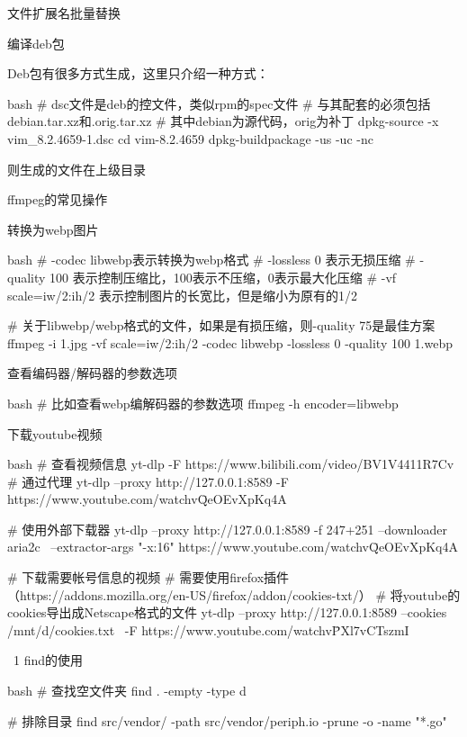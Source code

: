 \begin{outline}[enumerate]
\1 文件扩展名批量替换


\1 编译deb包

Deb包有很多方式生成，这里只介绍一种方式：
\begin{code-block}{bash}
# dsc文件是deb的控文件，类似rpm的spec文件
# 与其配套的必须包括debian.tar.xz和.orig.tar.xz
# 其中debian为源代码，orig为补丁
dpkg-source -x  vim_8.2.4659-1.dsc
cd vim-8.2.4659
dpkg-buildpackage -us -uc -nc
\end{code-block}

则生成的文件在上级目录


\1 ffmpeg的常见操作

\2 转换为webp图片

\begin{code-block}{bash}
# -codec libwebp表示转换为webp格式
# -lossless 0 表示无损压缩
# -quality 100 表示控制压缩比，100表示不压缩，0表示最大化压缩
# -vf scale=iw/2:ih/2 表示控制图片的长宽比，但是缩小为原有的1/2

# 关于libwebp/webp格式的文件，如果是有损压缩，则-quality 75是最佳方案
ffmpeg -i 1.jpg  -vf scale=iw/2:ih/2 -codec libwebp -lossless 0 -quality 100 1.webp
\end{code-block}

\2 查看编码器/解码器的参数选项

\begin{code-block}{bash}
# 比如查看webp编解码器的参数选项
ffmpeg -h encoder=libwebp
\end{code-block}

\1 下载youtube视频

\begin{code-block}{bash}
# 查看视频信息
yt-dlp -F https://www.bilibili.com/video/BV1V4411R7Cv
# 通过代理
yt-dlp --proxy http://127.0.0.1:8589 -F https://www.youtube.com/watch\?v\=QeOEvXpKq4A

# 使用外部下载器
yt-dlp --proxy http://127.0.0.1:8589 -f 247+251 --downloader aria2c \
  --extractor-args "-x:16" https://www.youtube.com/watch\?v\=QeOEvXpKq4A

# 下载需要帐号信息的视频
# 需要使用firefox插件（https://addons.mozilla.org/en-US/firefox/addon/cookies-txt/）
# 将youtube的cookies导出成Netscape格式的文件
yt-dlp --proxy http://127.0.0.1:8589 --cookies /mnt/d/cookies.txt \
  -F https://www.youtube.com/watch\?v\=PXl7vCTszmI
\end{code-block}

\ 1 find的使用

\begin{code-block}{bash}
# 查找空文件夹
find . -empty -type d

# 排除目录
find src/vendor/ -path src/vendor/periph.io -prune -o -name "*.go"
\end{code-block}

\end{outline}



